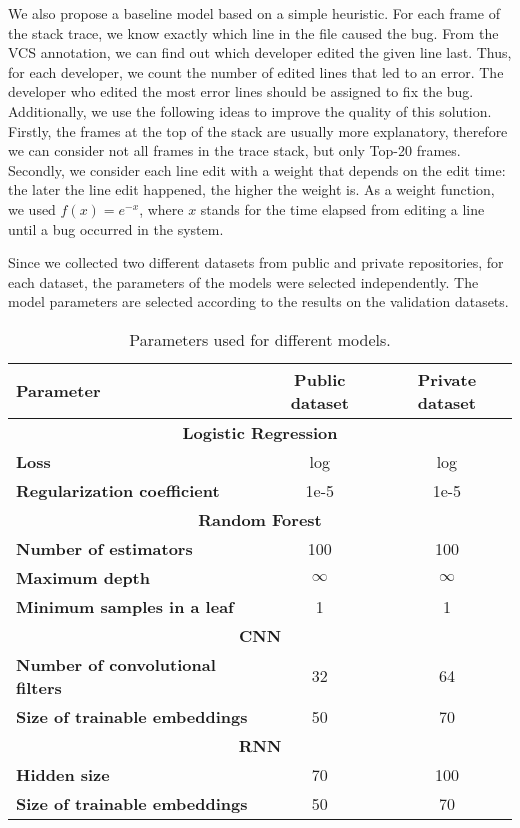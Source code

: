 We also propose a baseline model based on a simple heuristic. For each frame of the stack trace, we know exactly which line in the file caused the bug. From the VCS annotation, we can find out which developer edited the given line last. Thus, for each developer, we count the number of edited lines that led to an error. The developer who edited the most error lines should be assigned to fix the bug. Additionally, we use the following ideas to improve the quality of this solution. Firstly, the frames at the top of the stack are usually more explanatory, therefore we can consider not all frames in the trace stack, but only Top-20 frames. Secondly, we consider each line edit with a weight that depends on the edit time: the later the line edit happened, the higher the weight is. As a weight function, we used $f(x) = e^{-x}$, where $x$ stands for the time elapsed from editing a line until a bug occurred in the system.


Since we collected two different datasets from public and private repositories, for each dataset, the parameters of the models were selected independently. The model parameters are selected according to the results on the validation datasets.

\begin{table}[t]
    \centering
    \caption{Parameters used for different models.}
    \label{table:model_parameters}
    \begin{tabular}{lcc}
        \toprule
        \textbf{Parameter} & \textbf{Public dataset} & \textbf{Private dataset} \\
        \midrule
        \multicolumn{3}{c}{\textbf{Logistic Regression}} \\\midrule
        \textbf{Loss} & log & log \\
        \textbf{Regularization coefficient} & 1e-5 & 1e-5 \\\midrule
        
        \multicolumn{3}{c}{\textbf{Random Forest}} \\\midrule
        \textbf{Number of estimators} & 100 & 100 \\
        \textbf{Maximum depth} & $\infty$ & $ \infty$\\
        \textbf{Minimum samples in a leaf} & 1 & 1 \\\midrule
        
        \multicolumn{3}{c}{\textbf{CNN}} \\\midrule
        \textbf{Number of convolutional filters} & 32 & 64 \\
        \textbf{Size of trainable embeddings} & 50 & 70\\\midrule
        
        \multicolumn{3}{c}{\textbf{RNN}} \\\midrule
        \textbf{Hidden size} & 70 & 100 \\
        \textbf{Size of trainable embeddings} & 50 & 70\\
        \bottomrule
    \end{tabular}
\end{table}

